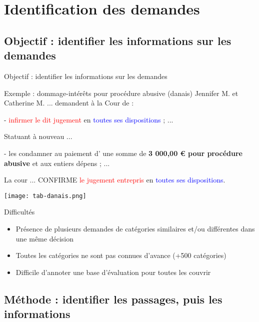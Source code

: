 \section{Identification des demandes}
\subsection{Objectif : identifier les informations sur les demandes}
\begin{frame}[c]{Objectif : identifier les informations sur les demandes}
\begin{exampleblock}{\scriptsize Exemple : dommage-intérêts pour procédure abusive (danais)}
	\scriptsize
	Jennifer M. et Catherine M. ... demandent à la Cour de :
	
	- \textcolor{red}{infirmer le dit jugement} en \textcolor{blue}{toutes ses dispositions} ; 
	...
	
	Statuant à nouveau ...
	
	- les condamner au paiement d' une somme de  \textbf{3 000,00 € pour procédure abusive} et
	aux entiers dépens ; ...
	
	La cour ... CONFIRME \textcolor{red}{le jugement entrepris} en \textcolor{blue}{toutes ses dispositions}.
	
	\centering \texttt{[image: tab-danais.png]}
\end{exampleblock}

\begin{alertblock}{\scriptsize Difficultés}
	\begin{itemize}\scriptsize 
		\item Présence de plusieurs demandes de catégories similaires et/ou différentes dans une même décision
		\item Toutes les catégories ne sont pas connues d'avance (+500 catégories)
		\item Difficile d'annoter une base d'évaluation pour toutes les couvrir
	\end{itemize}
\end{alertblock}
\end{frame}

\subsection{Méthode : identifier les passages, puis les informations}

